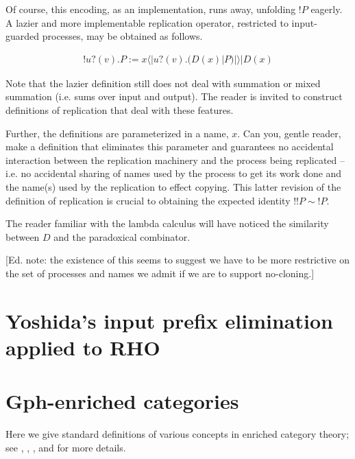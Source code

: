 \documentclass{llncs}
\newcommand{\lliftb}{\langle\!|}
\newcommand{\rliftb}{|\!\rangle}
\newcommand{\binpar}[2]{#1 | #2}
\newcommand{\prefix}[3]{#1?(#2) . #3}
\newcommand{\lift}[2]{#1 \lliftb #2 \rliftb}
\newcommand{\bangp}[1]{! #1}
\begin{document}
Of course, this encoding, as an implementation, runs away, unfolding
$\bangp{P}$ eagerly. A lazier and more implementable replication
operator, restricted to input-guarded processes, may be obtained as follows.

\begin{eqnarray}
\bangp{\prefix{u}{v}{P}} 
	:= 
	\binpar{\lift{x}{\prefix{u}{v}{(\binpar{D(x)}{P})}}}{D(x)} \nonumber
\end{eqnarray}

\begin{remark}
  Note that the lazier definition still does not deal with summation
  or mixed summation (i.e. sums over input and output). The reader is
  invited to construct definitions of replication that deal with these
  features. 

  Further, the definitions are parameterized in a name, $x$. Can you,
  gentle reader, make a definition that eliminates this parameter and
  guarantees no accidental interaction between the replication
  machinery and the process being replicated -- i.e. no accidental
  sharing of names used by the process to get its work done and the
  name(s) used by the replication to effect copying. This latter
  revision of the definition of replication is crucial to obtaining
  the expected identity $!!P \sim !P$.
\end{remark}

\begin{remark}\label{rem:paradoxical_combinator}
  The reader familiar with the lambda calculus will have noticed the
  similarity between $D$ and the paradoxical combinator.

  [Ed. note: the existence of this seems to suggest we have to be more
  restrictive on the set of processes and names we admit if we are to
  support no-cloning.]
\end{remark}

\section{Yoshida's input prefix elimination applied to RHO}

\section{Gph-enriched categories}
Here we give standard definitions of various concepts in enriched category theory; see \cite{CIS-335497},
\cite{Power99EnrichedLawvereTheories},
\cite{DBLP:journals/acs/LackR11},
and \cite{Trimble} for more details.
\end{document}
